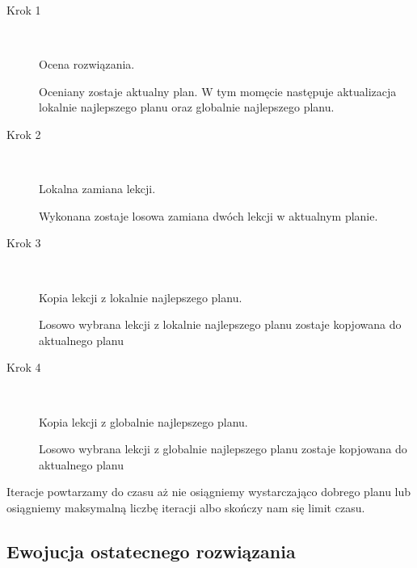 \begin{description}
  \item[Krok 1] \hfill \\
     \par Ocena rozwiązania. \hfill \\
   \par Oceniany zostaje aktualny plan. W tym momęcie następuje aktualizacja lokalnie najlepszego planu oraz globalnie najlepszego planu.
  \item[Krok 2] \hfill \\
     \par Lokalna zamiana lekcji. \hfill \\
    \par Wykonana zostaje losowa zamiana dwóch lekcji w aktualnym planie.

  \item[Krok 3] \hfill \\
      \par Kopia lekcji z lokalnie najlepszego planu. \hfill \\
        \par Losowo wybrana lekcji z lokalnie najlepszego planu zostaje kopjowana do aktualnego planu 
  \item[Krok 4] \hfill \\
      \par Kopia lekcji z globalnie najlepszego planu. \hfill \\
        \par Losowo wybrana lekcji z globalnie najlepszego planu zostaje kopjowana do aktualnego planu 
\end{description}
\par Iteracje powtarzamy do czasu aż nie osiągniemy wystarczająco dobrego planu lub osiągniemy maksymalną liczbę iteracji albo skończy nam się limit czasu.
\subsection{Ewojucja ostatecnego rozwiązania}
